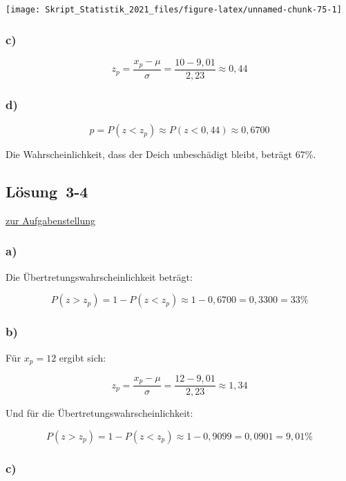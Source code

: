 \documentclass[
  11pt,
  ngerman,
  a4paper,
]{report}
\begin{document}
\begin{center}\texttt{[image: Skript\_Statistik\_2021\_files/figure-latex/unnamed-chunk-75-1]} \end{center}

\hypertarget{c-8}{%
\subsubsection{c)}\label{c-8}}

\[z_p=\frac{x_p- \mu}{\sigma} = \frac{10-9,01}{2,23}\approx0,44\]

\hypertarget{d-3}{%
\subsubsection{d)}\label{d-3}}

\[p=P(z<z_p)\approx P(z<0,44)\approx0,6700\]

Die Wahrscheinlichkeit, dass der Deich unbeschädigt bleibt, beträgt 67\%.

\hypertarget{loesung-3-4}{%
\subsection{Lösung~3-4}\label{loesung-3-4}}

\protect\hyperlink{aufgabe-3-4}{zur Aufgabenstellung}

\hypertarget{a-11}{%
\subsubsection{a)}\label{a-11}}

Die Übertretungswahrscheinlichkeit beträgt:

\[P(z>z_p) = 1- P(z<z_p) \approx 1-0,6700 = 0,3300 = 33\% \]

\hypertarget{b-11}{%
\subsubsection{b)}\label{b-11}}

Für \(x_p=12\) ergibt sich:

\[ z_p=\frac{x_p- \mu}{\sigma} = \frac{12-9,01}{2,23}\approx1,34 \]

Und für die Übertretungswahrscheinlichkeit:

\[P(z>z_p) = 1- P(z<z_p) \approx 1-0,9099 = 0,0901= 9,01\% \]

\hypertarget{c-9}{%
\subsubsection{c)}\label{c-9}}
\end{document}
